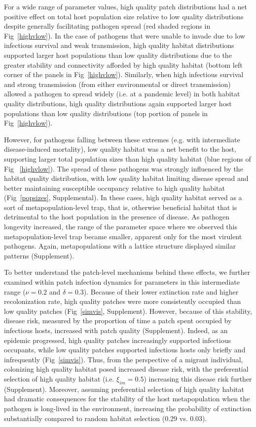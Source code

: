 \documentclass{article}
\begin{document}
For a wide range of parameter values, high quality patch distributions had a net positive effect on total host population size relative to low quality distributions despite generally facilitating pathogen spread (red shaded regions in Fig~\ref{highvlow}).  
In the case of pathogens that were unable to invade due to low infectious survival and weak transmission, high quality habitat distributions supported larger host populations than low quality distributions due to the greater stability and connectivity afforded by high quality habitat (bottom left corner of the panels in Fig~\ref{highvlow}). 
Similarly, when high infectious survival and strong transmission (from either environmental or direct transmission) allowed a pathogen to spread widely (i.e. at a pandemic level) in both habitat quality distributions, high quality distributions again supported larger host populations than low quality distributions (top portion of panels in Fig~\ref{highvlow}).

However, for pathogens falling between these extremes (e.g. with intermediate disease-induced mortality), low quality habitat was a net benefit to the host, supporting larger total population sizes than high quality habitat (blue regions of Fig ~\ref{highvlow}).
The spread of these pathogens was strongly influenced by the habitat quality distribution, with low quality habitat limiting disease spread and better maintaining susceptible occupancy relative to high quality habitat (Fig~\ref{popsizes}, Supplemental).
In these cases, high quality habitat served as a sort of metapopulation-level trap, that is, otherwise beneficial habitat that is detrimental to the host population in the presence of disease.
As pathogen longevity increased, the range of the parameter space where we observed this metapopulation-level trap became smaller, apparent only for the most virulent pathogens.
Again, metapopulations with a lattice structure displayed similar patterns (Supplement).

To better understand the patch-level mechanisms behind these effects, we further examined within patch infection dynamics for parameters in this intermediate range ($\nu = 0.2$ and $\delta = 0.3$).  
Because of their lower extinction rate and higher recolonization rate, high quality patches were more consistently occupied than low quality patches (Fig~\ref{simvis}, Supplement).  
However, because of this stability, disease risk, measured by the proportion of time a patch spent occupied by infectious hosts, increased with patch quality (Supplement).
Indeed, as an epidemic progressed, high quality patches increasingly supported infectious occupants, while low quality patches supported infectious hosts only briefly and infrequently (Fig~\ref{simvis}).  
Thus, from the perspective of a migrant individual, colonizing high quality habitat posed increased disease risk, with the preferential selection of high quality habitat (i.e. $\xi_{im} = 0.5$) increasing this disease risk further (Supplement).
Moreover, assuming preferential selection of high quality habitat had dramatic consequences for the stability of the host metapopulation when the pathogen is long-lived in the environment, increasing the probability of extinction substantially compared to random habitat selection (0.29 vs. 0.03).
\end{document}
